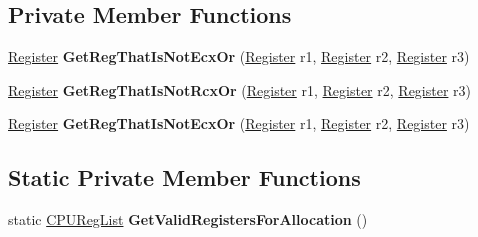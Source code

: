 \subsection*{Private Member Functions}
\begin{DoxyCompactItemize}
\item 
\hyperlink{structv8_1_1internal_1_1_register}{Register} {\bfseries Get\+Reg\+That\+Is\+Not\+Ecx\+Or} (\hyperlink{structv8_1_1internal_1_1_register}{Register} r1, \hyperlink{structv8_1_1internal_1_1_register}{Register} r2, \hyperlink{structv8_1_1internal_1_1_register}{Register} r3)\hypertarget{classv8_1_1internal_1_1_record_write_stub_1_1_register_allocation_aaa2ceb177026dbea8c21163b6a402096}{}\label{classv8_1_1internal_1_1_record_write_stub_1_1_register_allocation_aaa2ceb177026dbea8c21163b6a402096}

\item 
\hyperlink{structv8_1_1internal_1_1_register}{Register} {\bfseries Get\+Reg\+That\+Is\+Not\+Rcx\+Or} (\hyperlink{structv8_1_1internal_1_1_register}{Register} r1, \hyperlink{structv8_1_1internal_1_1_register}{Register} r2, \hyperlink{structv8_1_1internal_1_1_register}{Register} r3)\hypertarget{classv8_1_1internal_1_1_record_write_stub_1_1_register_allocation_a6b9c61e72465fa0bc58660f07a6cb4f5}{}\label{classv8_1_1internal_1_1_record_write_stub_1_1_register_allocation_a6b9c61e72465fa0bc58660f07a6cb4f5}

\item 
\hyperlink{structv8_1_1internal_1_1_register}{Register} {\bfseries Get\+Reg\+That\+Is\+Not\+Ecx\+Or} (\hyperlink{structv8_1_1internal_1_1_register}{Register} r1, \hyperlink{structv8_1_1internal_1_1_register}{Register} r2, \hyperlink{structv8_1_1internal_1_1_register}{Register} r3)\hypertarget{classv8_1_1internal_1_1_record_write_stub_1_1_register_allocation_aaa2ceb177026dbea8c21163b6a402096}{}\label{classv8_1_1internal_1_1_record_write_stub_1_1_register_allocation_aaa2ceb177026dbea8c21163b6a402096}

\end{DoxyCompactItemize}
\subsection*{Static Private Member Functions}
\begin{DoxyCompactItemize}
\item 
static \hyperlink{classv8_1_1internal_1_1_c_p_u_reg_list}{C\+P\+U\+Reg\+List} {\bfseries Get\+Valid\+Registers\+For\+Allocation} ()\hypertarget{classv8_1_1internal_1_1_record_write_stub_1_1_register_allocation_af56a1c88afe6a90a8533fdcf8c5d9711}{}\label{classv8_1_1internal_1_1_record_write_stub_1_1_register_allocation_af56a1c88afe6a90a8533fdcf8c5d9711}

\end{DoxyCompactItemize}
